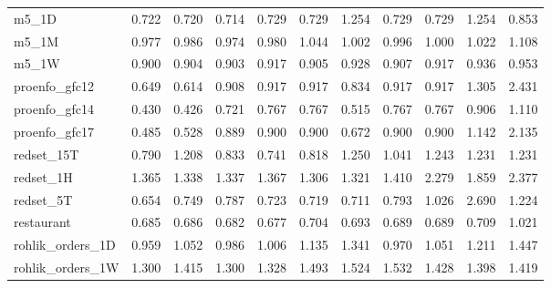 {\begin{longtable}{@{}p{2.2cm}@{\hspace{6pt}}rrrrrrrrrr@{}}
\ttfamily\scriptsize m5\_1D & \cellcolor{medalBronze}0.722 & \cellcolor{medalSilver}0.720 & \cellcolor{medalGold}0.714 & 0.729 & 0.729 & 1.254 & 0.729 & 0.729 & 1.254 & 0.853 \\
\ttfamily\scriptsize m5\_1M & \cellcolor{medalSilver}0.977 & 0.986 & \cellcolor{medalGold}0.974 & \cellcolor{medalBronze}0.980 & 1.044 & 1.002 & 0.996 & 1.000 & 1.022 & 1.108 \\
\ttfamily\scriptsize m5\_1W & \cellcolor{medalGold}0.900 & \cellcolor{medalBronze}0.904 & \cellcolor{medalSilver}0.903 & 0.917 & 0.905 & 0.928 & 0.907 & 0.917 & 0.936 & 0.953 \\
\ttfamily\scriptsize proenfo\_gfc12 & \cellcolor{medalSilver}0.649 & \cellcolor{medalGold}0.614 & 0.908 & 0.917 & 0.917 & \cellcolor{medalBronze}0.834 & 0.917 & 0.917 & 1.305 & 2.431 \\
\ttfamily\scriptsize proenfo\_gfc14 & \cellcolor{medalSilver}0.430 & \cellcolor{medalGold}0.426 & 0.721 & 0.767 & 0.767 & \cellcolor{medalBronze}0.515 & 0.767 & 0.767 & 0.906 & 1.110 \\
\ttfamily\scriptsize proenfo\_gfc17 & \cellcolor{medalGold}0.485 & \cellcolor{medalSilver}0.528 & 0.889 & 0.900 & 0.900 & \cellcolor{medalBronze}0.672 & 0.900 & 0.900 & 1.142 & 2.135 \\
\ttfamily\scriptsize redset\_15T & \cellcolor{medalSilver}0.790 & 1.208 & 0.833 & \cellcolor{medalGold}0.741 & \cellcolor{medalBronze}0.818 & 1.250 & 1.041 & 1.243 & 1.231 & 1.231 \\
\ttfamily\scriptsize redset\_1H & 1.365 & 1.338 & \cellcolor{medalBronze}1.337 & 1.367 & \cellcolor{medalGold}1.306 & \cellcolor{medalSilver}1.321 & 1.410 & 2.279 & 1.859 & 2.377 \\
\ttfamily\scriptsize redset\_5T & \cellcolor{medalGold}0.654 & 0.749 & 0.787 & 0.723 & \cellcolor{medalBronze}0.719 & \cellcolor{medalSilver}0.711 & 0.793 & 1.026 & 2.690 & 1.224 \\
\ttfamily\scriptsize restaurant & \cellcolor{medalBronze}0.685 & 0.686 & \cellcolor{medalSilver}0.682 & \cellcolor{medalGold}0.677 & 0.704 & 0.693 & 0.689 & 0.689 & 0.709 & 1.021 \\
\ttfamily\scriptsize rohlik\_orders\_1D & \cellcolor{medalGold}0.959 & 1.052 & \cellcolor{medalBronze}0.986 & 1.006 & 1.135 & 1.341 & \cellcolor{medalSilver}0.970 & 1.051 & 1.211 & 1.447 \\
\ttfamily\scriptsize rohlik\_orders\_1W & \cellcolor{medalGold}1.300 & 1.415 & \cellcolor{medalSilver}1.300 & \cellcolor{medalBronze}1.328 & 1.493 & 1.524 & 1.532 & 1.428 & 1.398 & 1.419 \\

\end{longtable}}
